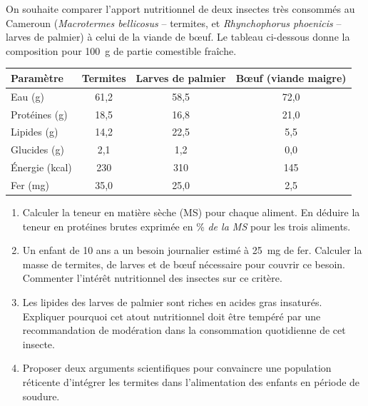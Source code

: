 \documentclass[11pt]{article}
\begin{document}
\begin{exercice}
On souhaite comparer l'apport nutritionnel de deux insectes très consommés au Cameroun (\textit{Macrotermes bellicosus} -- termites, et \textit{Rhynchophorus phoenicis} -- larves de palmier) à celui de la viande de bœuf. Le tableau ci-dessous donne la composition pour \SI{100}{\gram} de partie comestible fraîche.

\begin{center}
\begin{tabular}{|l|c|c|c|}
\hline
\textbf{Paramètre} & \textbf{Termites} & \textbf{Larves de palmier} & \textbf{Bœuf (viande maigre)} \\
\hline
Eau (\si{\gram}) & 61,2 & 58,5 & 72,0 \\
Protéines (\si{\gram}) & 18,5 & 16,8 & 21,0 \\
Lipides (\si{\gram}) & 14,2 & 22,5 & 5,5 \\
Glucides (\si{\gram}) & 2,1 & 1,2 & 0,0 \\
Énergie (\si{kcal}) & 230 & 310 & 145 \\
Fer (\si{\milli\gram}) & 35,0 & 25,0 & 2,5 \\
\hline
\end{tabular}
\end{center}

\begin{enumerate}
\item Calculer la teneur en matière sèche (MS) pour chaque aliment. En déduire la teneur en protéines brutes exprimée en \%\textit{ de la MS} pour les trois aliments.
\item Un enfant de 10 ans a un besoin journalier estimé à \SI{25}{\milli\gram} de fer. Calculer la masse de termites, de larves et de bœuf nécessaire pour couvrir ce besoin. Commenter l'intérêt nutritionnel des insectes sur ce critère.
\item Les lipides des larves de palmier sont riches en acides gras insaturés. Expliquer pourquoi cet atout nutritionnel doit être tempéré par une recommandation de modération dans la consommation quotidienne de cet insecte.
\item Proposer deux arguments scientifiques pour convaincre une population réticente d'intégrer les termites dans l'alimentation des enfants en période de soudure.
\end{enumerate}
\end{exercice}
\end{document}
